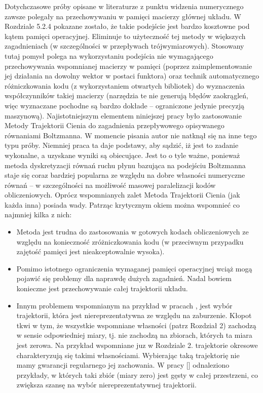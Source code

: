 \documentclass[12pt]{article}
\begin{document}
Dotychczasowe próby opisane w literaturze z punktu widzenia numerycznego zawsze polegały na przechowywaniu w pamięci macierzy głównej układu. W Rozdziale 5.2.4 pokazane zostało, że takie podejście jest bardzo kosztowne pod kątem pamięci operacyjnej. Eliminuje to użyteczność tej metody w większych zagadnieniach (w szczególności w przepływach trójwymiarowych). Stosowany tutaj pomysł polega na wykorzystaniu podejścia nie wymagającego przechowywania wspomnianej macierzy w pamięci (poprzez zaimplementowanie jej działania na dowolny wektor w postaci funktora) oraz technik automatycznego różniczkowania kodu (z wykorzystaniem otwartych bibliotek) do wyznaczenia współczynników takiej macierzy (narzędzia te nie generują błędów zaokrągleń, więc wyznaczane pochodne są bardzo dokłade – ograniczone jedynie precyzją maszynową). \newline
Najistotniejszym elementem niniejszej pracy było zastosowanie Metody Trajektorii Cienia do zagadnienia przepływowego opisywanego równaniami Boltzmanna. W momencie pisania autor nie natknął się na inne tego typu próby. Niemniej praca ta daje podstawy, aby sądzić, iż jest to zadanie wykonalne, a uzyskane wyniki są obiecujące. Jest to o tyle ważne, ponieważ metoda dyskretyzacji równań ruchu płynu bazująca na podejściu Boltzmanna staje się coraz bardziej popularna ze względu na dobre własności numeryczne równań – w szczególności na możliwość masowej paralelizacji kodów obliczeniowych. 
Oprócz wspomnianych zalet Metoda Trajektorii Cienia (jak każda inna) posiada wady. Patrząc krytycznym okiem można wspomnieć co najmniej kilka z nich:
\begin{itemize}
	\item Metoda jest trudna do zastosowania w gotowych kodach obliczeniowych ze względu na konieczność zróżniczkowania kodu (w przeciwnym przypadku zajętość pamięci jest nieakceptowalnie wysoka).
	\item Pomimo istotnego ograniczenia wymaganej pamięci operacyjnej wciąż mogą pojawić się problemy dla naprawdę dużych zagadnień. Nadal bowiem konieczne jest przechowywanie całej trajektorii układu.
	\item Innym problemem wspomnianym na przykład w pracach \cite{Chandramoorthy2}, \cite{Chandramoorthy3} jest wybór trajektorii, która jest niereprezentatywna ze względu na zaburzenie. Kłopot tkwi w tym, że wszystkie wspomniane własności (patrz Rozdział 2) zachodzą w sensie odpowiedniej miary, tj. nie zachodzą na zbiorach, których ta miara jest zerowa. Na przykład wspomniane juz w Rozdziale 2. trajektorie okresowe charakteryzują się takimi własnościami. Wybierając taką trajektorię nie mamy gwarancji regularnego jej zachowania. W pracy [] odnaleziono przykłady, w których taki zbiór (miary zero) jest gęsty w całej przestrzeni, co zwiększa szansę na wybór niereprezentatywnej trajektorii.
\end{itemize}
\end{document}
